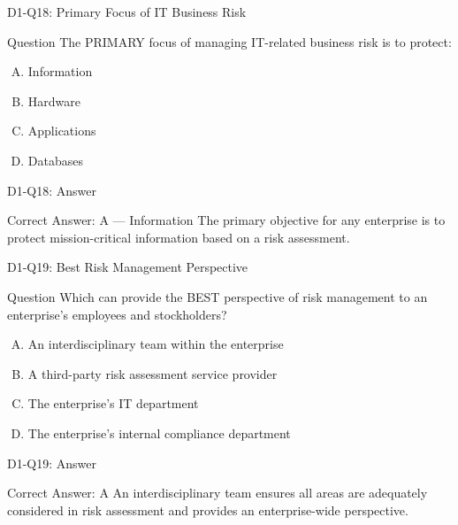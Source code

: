 \documentclass{beamer}
\begin{document}
	\begin{frame}{D1-Q18: Primary Focus of IT Business Risk}
		\begin{block}{Question}
			The PRIMARY focus of managing IT-related business risk is to protect:
		\end{block}
		\begin{enumerate}[(A)]
			\item Information
			\item Hardware
			\item Applications
			\item Databases
		\end{enumerate}
	\end{frame}
	\begin{frame}{D1-Q18: Answer}
		\begin{block}{Correct Answer: A --- Information}
			The primary objective for any enterprise is to protect mission-critical information based on a risk assessment.
		\end{block}
	\end{frame}
	
	\begin{frame}{D1-Q19: Best Risk Management Perspective}
		\begin{block}{Question}
			Which can provide the BEST perspective of risk management to an enterprise's employees and stockholders?
		\end{block}
		\begin{enumerate}[(A)]
			\item An interdisciplinary team within the enterprise
			\item A third-party risk assessment service provider
			\item The enterprise's IT department
			\item The enterprise's internal compliance department
		\end{enumerate}
	\end{frame}
	\begin{frame}{D1-Q19: Answer}
		\begin{block}{Correct Answer: A}
			An interdisciplinary team ensures all areas are adequately considered in risk assessment and provides an enterprise-wide perspective.
		\end{block}
	\end{frame}
	
\end{document}

